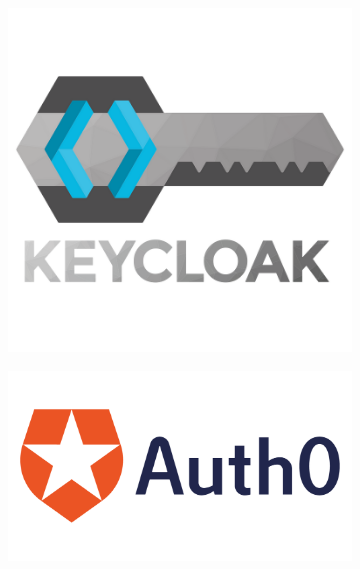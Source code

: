 \begin{figure}[h!]
  \centering
  \begin{subfigure}[b]{0.3\textwidth}
    \includegraphics[width=\textwidth]{Images/keycloak.png}
    \label{fig:keycloak}
  \end{subfigure}
  \hfill
  \begin{subfigure}[b]{0.3\textwidth}
    \includegraphics[width=\textwidth]{Images/auth0.png}
    \label{fig:auth0}
  \end{subfigure}
  \hfill
  \begin{subfigure}[b]{0.3\textwidth}

\end{subfigure}
\end{figure}
